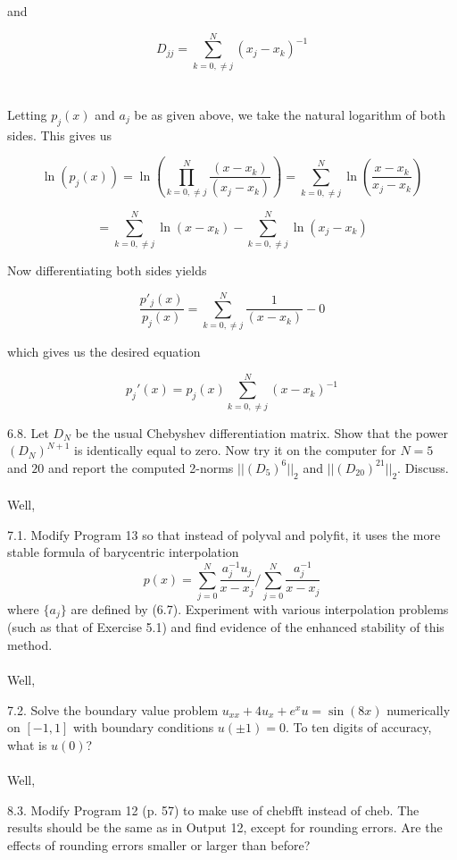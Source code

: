 \documentclass[12pt]{article}
\begin{document}
and

$$D_{jj}=\sum_{k=0,\neq j}^N(x_j-x_k)^{-1}$$\\\\

Letting $p_j(x)$ and $a_j$ be as given above, we take the natural logarithm of both sides. This gives us

$$\ln(p_j(x))=\ln(\prod_{k=0,\neq j}^N\frac{(x-x_k)}{(x_j-x_k)})=\sum_{k=0,\neq j}^N\ln(\frac{x-x_k}{x_j-x_k})$$

$$=\sum_{k=0,\neq j}^N\ln(x-x_k)-\sum_{k=0,\neq j}^N\ln(x_j-x_k)$$

Now differentiating both sides yields

$$\frac{p'_j(x)}{p_j(x)}=\sum_{k=0,\neq j}^N\frac{1}{(x-x_k)}-0$$

which gives us the desired equation

$$p_j'(x)=p_j(x)\sum_{k=0,\neq j}^N(x-x_k)^{-1}$$

\newpage

6.8. Let $D_N$ be the usual Chebyshev differentiation matrix. Show that the power $(D_N)^{N+1}$ is identically equal to zero. Now try it on the computer for $N=5$ and $20$ and report the computed 2-norms $||(D_5)^6||_2$ and $||(D_{20})^{21}||_2$. Discuss.\\\\

Well,

\newpage

7.1. Modify Program 13 so that instead of polyval and polyfit, it uses the more stable formula of barycentric interpolation
$$p(x)=\sum_{j=0}^N\frac{a_j^{-1}u_j}{x-x_j}/\sum_{j=0}^N\frac{a_j^{-1}}{x-x_j}$$
where $\{a_j\}$ are defined by (6.7). Experiment with various interpolation problems (such as that of Exercise 5.1) and find evidence of the enhanced stability of this method.\\\\

Well,

\newpage

\newpage

7.2. Solve the boundary value problem $u_{xx}+4u_x+e^xu=\sin(8x)$ numerically on $[-1,1]$ with boundary conditions $u(\pm1)=0$. To ten digits of accuracy, what is $u(0)$?\\\\

Well,

\newpage

\newpage

8.3. Modify Program 12 (p. 57) to make use of chebfft instead of cheb. The results should be the same as in Output 12, except for rounding errors. Are the effects of rounding errors smaller or larger than before?\\\\
\end{document}
